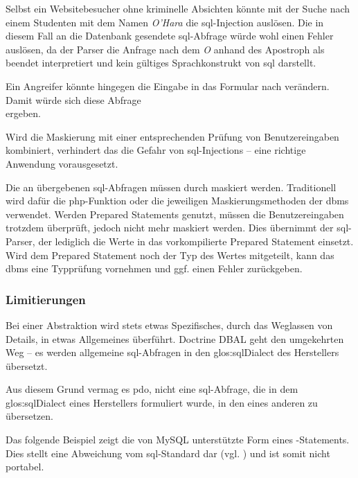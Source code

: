 Selbst ein Websitebesucher ohne kriminelle Absichten könnte mit der Suche nach einem Studenten mit dem Namen \textit{O'Hara} die \gls{sql}-Injection auslösen. Die in diesem Fall an die Datenbank gesendete \gls{sql}-Abfrage  würde wohl einen Fehler auslösen, da der Parser die Anfrage nach dem \textit{O} anhand des Apostroph als beendet interpretiert und  kein gültiges Sprachkonstrukt von \gls{sql} darstellt.

Ein Angreifer könnte hingegen die Eingabe in das Formular nach  verändern. Damit würde sich diese Abfrage\\  ergeben.

Wird die Maskierung mit einer entsprechenden Prüfung von Benutzereingaben kombiniert, verhindert das die Gefahr von \gls{sql}-Injections – eine richtige Anwendung vorausgesetzt.

Die an  übergebenen \gls{sql}-Abfragen müssen durch  maskiert werden. Traditionell wird dafür die \gls{php}-Funktion  oder die jeweiligen Maskierungsmethoden der \gls{dbms} verwendet. Werden Prepared Statements genutzt, müssen die Benutzereingaben trotzdem überprüft, jedoch nicht mehr maskiert werden. Dies übernimmt der \gls{sql}-Parser, der lediglich die Werte in das vorkompilierte Prepared Statement einsetzt. Wird dem Prepared Statement noch der Typ des Wertes mitgeteilt, kann das \gls{dbms} eine Typprüfung vornehmen und ggf. einen Fehler zurückgeben.

\subsubsection{Limitierungen}
\label{basics:doctrine:subsubsec:limitsOfAbstraction}
Bei einer Abstraktion wird stets etwas Spezifisches, durch das Weglassen von Details, in etwas Allgemeines überführt. Doctrine DBAL geht den umgekehrten Weg – es werden allgemeine \gls{sql}-Abfragen in den \gls{glos:sqlDialect} des Herstellers übersetzt.

Aus diesem Grund vermag es \gls{pdo}, nicht eine \gls{sql}-Abfrage, die in dem \gls{glos:sqlDialect} eines Herstellers formuliert wurde, in den eines anderen zu übersetzen.

Das folgende Beispiel zeigt die von MySQL unterstützte Form eines -Statements. Dies stellt eine Abweichung vom \gls{sql}-Standard dar (vgl. \cite[S. 388]{website:SQLStandard1992}) und ist somit nicht portabel.

